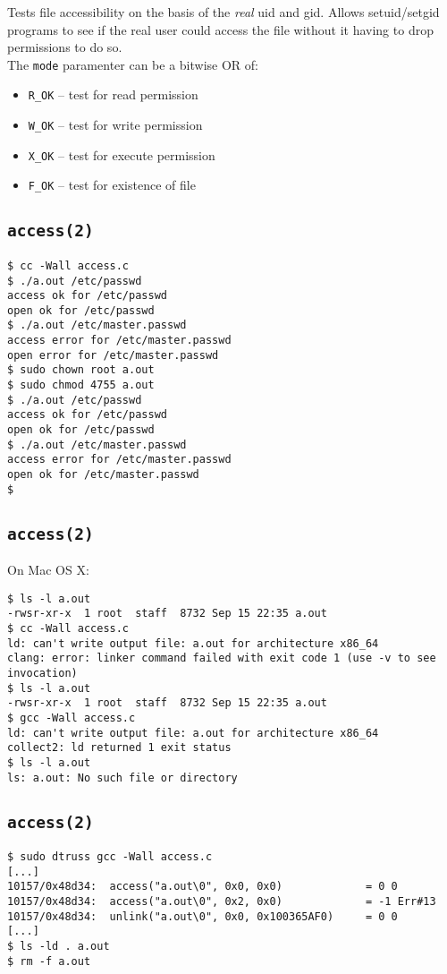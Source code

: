 \documentclass[xga]{xdvislides}
\begin{document}
Tests file accessibility on the basis of the {\em real} uid and gid. Allows
setuid/setgid programs to see if the real user could access the file without
it having to drop permissions to do so.
\\

The {\tt mode} paramenter can be a bitwise OR of:

\begin{itemize}
	\item {\tt R\_OK} -- test for read permission
	\item {\tt W\_OK} -- test for write permission
	\item {\tt X\_OK} -- test for execute permission
	\item {\tt F\_OK} -- test for existence of file
\end{itemize}

\subsection{{\tt access(2)}}
\begin{verbatim}
$ cc -Wall access.c
$ ./a.out /etc/passwd
access ok for /etc/passwd
open ok for /etc/passwd
$ ./a.out /etc/master.passwd
access error for /etc/master.passwd
open error for /etc/master.passwd
$ sudo chown root a.out
$ sudo chmod 4755 a.out
$ ./a.out /etc/passwd
access ok for /etc/passwd
open ok for /etc/passwd
$ ./a.out /etc/master.passwd
access error for /etc/master.passwd
open ok for /etc/master.passwd
$
\end{verbatim}

\subsection{{\tt access(2)}}
On Mac OS X:
\begin{verbatim}
$ ls -l a.out
-rwsr-xr-x  1 root  staff  8732 Sep 15 22:35 a.out
$ cc -Wall access.c
ld: can't write output file: a.out for architecture x86_64
clang: error: linker command failed with exit code 1 (use -v to see invocation)
$ ls -l a.out
-rwsr-xr-x  1 root  staff  8732 Sep 15 22:35 a.out
$ gcc -Wall access.c
ld: can't write output file: a.out for architecture x86_64
collect2: ld returned 1 exit status
$ ls -l a.out
ls: a.out: No such file or directory
\end{verbatim}

\subsection{{\tt access(2)}}
\begin{verbatim}
$ sudo dtruss gcc -Wall access.c
[...]
10157/0x48d34:  access("a.out\0", 0x0, 0x0)             = 0 0
10157/0x48d34:  access("a.out\0", 0x2, 0x0)             = -1 Err#13
10157/0x48d34:  unlink("a.out\0", 0x0, 0x100365AF0)     = 0 0
[...]
$ ls -ld . a.out
$ rm -f a.out
\end{verbatim}
\end{document}
